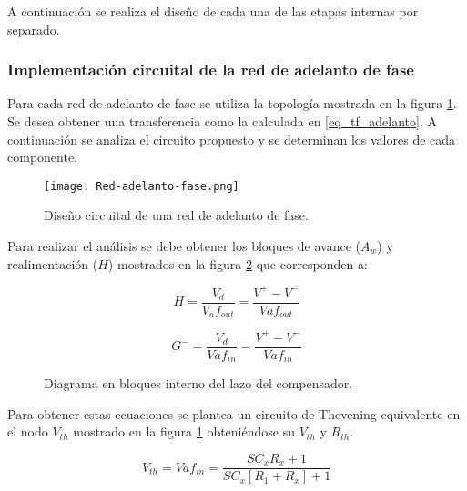 A continuación se realiza el diseño de cada una de las etapas internas por separado.

\subsubsection{Implementación circuital de la red de adelanto de fase}

Para cada red de adelanto de fase se utiliza la topología mostrada en la figura \ref{fig:red-adelanto-fase}. Se desea obtener una transferencia como la calculada en \ref{eq_tf_adelanto}. A continuación se analiza el circuito propuesto y se determinan los valores de cada componente. 

\begin{figure}[H]
	\centering
	\texttt{[image: Red-adelanto-fase.png]}
	\caption{Diseño circuital de una red de adelanto de fase.}
	\label{fig:red-adelanto-fase}
\end{figure}

Para realizar el análisis se debe obtener los bloques de avance ($A_w$) y realimentación ($H$) mostrados en la figura \ref{fig:diag-diagrama_lazo_compensador} que corresponden a:


\begin{equation} 
	H = \frac{V_d}{V_af_{out}}=\frac{V^+ - V^-}{Vaf_{out}}
	\label{eq:h_del_compensador}
\end{equation} 

\begin{equation} 
	G^- = \frac{V_d}{Vaf_{in}}=\frac{V^+ - V^-}{Vaf_{in}}
	\label{eq:g_del_compensador}
\end{equation}

\begin{figure}[H]
	\centering
	
	\caption{Diagrama en bloques interno del lazo del compensador.}	
	\label{fig:diag-diagrama_lazo_compensador}
\end{figure}

Para obtener estas ecuaciones se plantea un circuito de Thevening equivalente en el nodo $V_{th}$ mostrado en la figura \ref{fig:red-adelanto-fase} obteniéndose su $V_{th}$ y $R_{th}$.

\begin{equation} 
	V_{th} = Vaf_{in}= \frac{SC_xR_x+1}{SC_x[R_1+R_x]+1}
\end{equation}

